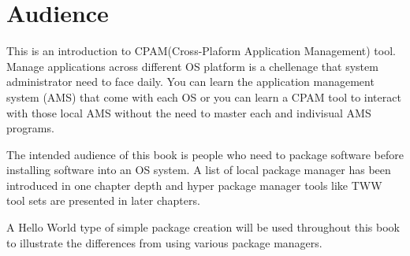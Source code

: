 \section*{Audience}
\noindent{}This is an introduction to CPAM(Cross-Plaform Application Management) tool. 
Manage applications across different OS platform is a chellenage that system administrator need to face daily. 
You can learn the application management system (AMS) that come with each OS or you can learn a CPAM tool to interact with those local AMS without the need to master each and indivisual AMS programs.


The intended audience of this book is people who need to package software before installing software into an OS system.
A list of local package manager has been introduced in one chapter depth and hyper package manager tools like TWW tool sets are presented in later chapters.

A Hello World type of simple package creation will be used throughout this book to illustrate the differences from using various package managers.
